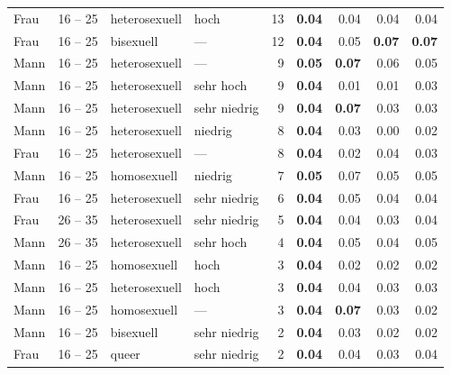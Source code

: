 \begin{ThreePartTable}
\begin{longtable}{llllr rrrr}
        Frau & 16 -- 25 & heterosexuell & hoch         & 13 & \textbf{0.04} & 0.04          & 0.04          & 0.04          \\
        Frau & 16 -- 25 & bisexuell     & ---          & 12 & \textbf{0.04} & 0.05          & \textbf{0.07} & \textbf{0.07} \\
        Mann & 16 -- 25 & heterosexuell & ---          &  9 & \textbf{0.05} & \textbf{0.07} & 0.06          & 0.05          \\
        Mann & 16 -- 25 & heterosexuell & sehr hoch    &  9 & \textbf{0.04} & 0.01          & 0.01          & 0.03          \\
        Mann & 16 -- 25 & heterosexuell & sehr niedrig &  9 & \textbf{0.04} & \textbf{0.07} & 0.03          & 0.03          \\
        Mann & 16 -- 25 & heterosexuell & niedrig      &  8 & \textbf{0.04} & 0.03          & 0.00          & 0.02          \\
        Frau & 16 -- 25 & heterosexuell & ---          &  8 & \textbf{0.04} & 0.02          & 0.04          & 0.03          \\
        Mann & 16 -- 25 & homosexuell   & niedrig      &  7 & \textbf{0.05} & 0.07          & 0.05          & 0.05          \\
        Frau & 16 -- 25 & heterosexuell & sehr niedrig &  6 & \textbf{0.04} & 0.05          & 0.04          & 0.04          \\
        Frau & 26 -- 35 & heterosexuell & sehr niedrig &  5 & \textbf{0.04} & 0.04          & 0.03          & 0.04          \\
        Mann & 26 -- 35 & heterosexuell & sehr hoch    &  4 & \textbf{0.04} & 0.05          & 0.04          & 0.05          \\
        Mann & 16 -- 25 & homosexuell   & hoch         &  3 & \textbf{0.04} & 0.02          & 0.02          & 0.02          \\
        Mann & 16 -- 25 & heterosexuell & hoch         &  3 & \textbf{0.04} & 0.04          & 0.03          & 0.03          \\
        Mann & 16 -- 25 & homosexuell   & ---          &  3 & \textbf{0.04} & \textbf{0.07} & 0.03          & 0.02          \\
        Mann & 16 -- 25 & bisexuell     & sehr niedrig &  2 & \textbf{0.04} & 0.03          & 0.02          & 0.02          \\
        Frau & 16 -- 25 & queer         & sehr niedrig &  2 & \textbf{0.04} & 0.04          & 0.03          & 0.04          \\
    
    \end{longtable}
\end{ThreePartTable}
\normalsize


